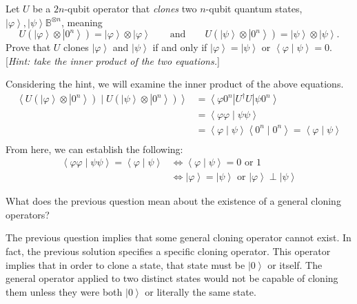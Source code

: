 \documentclass{exam} %
\newcommand{\m}[1]{\mathbb{#1}}    %
\theoremstyle{plain}
\theoremstyle{definition}
\theoremstyle{remark}
\numberwithin{equation}{section}  %
\renewcommand{\phi}{\varphi}
\newcommand{\bra}[1]{ \left< #1 \right| }
\newcommand{\ket}[1]{ \left| #1 \right> }
\newcommand{\bracket}[2]{ \left< #1 \mid #2 \right> }
\begin{document}
\begin{questions}
\question Let $U$ be a $2n$-qubit operator that \emph{clones} two $n$-qubit
quantum states, $\ket{\phi}, \ket{\psi} \m{B}^{\otimes n}$, meaning
\[
  U(\ket{\phi}\otimes \ket{0^n}) = \ket{\phi}\otimes \ket{\phi}
  \qquad\text{and}\qquad
  U(\ket{\psi}\otimes \ket{0^n}) = \ket{\psi}\otimes \ket{\psi}.
\]
Prove that $U$ clones $\ket{\phi}$ and $\ket{\psi}$ if and only if
$\ket{\phi} = \ket{\psi}$ or $\bracket{\phi}{\psi} = 0$. [\emph{Hint: take
the inner product of the two equations.}]
\begin{solution}
  Considering the hint, we will examine the inner product of the above 
  equations.
  \begin{align*}
    \bracket{U(\ket{\phi}\otimes \ket{0^n})}{U(\ket{\psi}\otimes \ket{0^n})}
    &= \bra{\phi 0^n} U^\dagger U \ket{\psi 0^n}\\
    &= \bracket{\phi \phi}{\psi \psi}\\ 
    &= \bracket{\phi}{\psi} \bracket{0^n}{0^n} = \bracket{\phi}{\psi}\\
  \end{align*}
  From here, we can establish the following:
  \begin{align*}
    \bracket{\phi \phi}{\psi \psi} = \bracket{\phi}{\psi} 
    &\Leftrightarrow
    \bracket{\phi}{\psi} = 0 \text{ or } 1\\
    &\Leftrightarrow \ket{\phi} = \ket{\psi} \text{ or } 
    \ket{\phi} \perp \ket{\psi}
  \end{align*}
\end{solution}
\question What does the previous question mean about the existence of a
general cloning operators?
\begin{solution}
  The previous question implies that some general cloning operator cannot exist. 
  In fact, the previous solution specifies a specific cloning operator. This 
  operator implies that in order to clone a state, that state must be $\ket{0}$
  or itself. The general operator applied to two distinct states would not be 
  capable of cloning them unless they were both $\ket{0}$ or literally the same
  state.
\end{solution}
\end{questions} 
\end{document}
